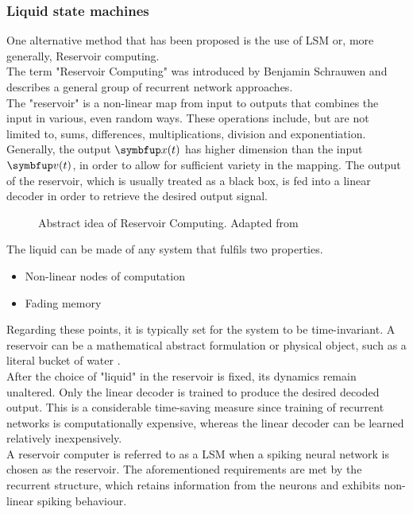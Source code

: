 \subsubsection{Liquid state machines}
One alternative method that has been proposed is the use of \ac{LSM} or, more generally, Reservoir computing.\\
The term "Reservoir Computing" was introduced by Benjamin Schrauwen and describes a general group of recurrent network approaches\cite{verstraeten_experimental_2007}.\\
The "reservoir" is a non-linear map from input to outputs that combines the input in various, even random ways. These operations include, but are not limited to, sums, differences, multiplications, division and exponentiation. Generally, the output $\bmu{x}(t)$ has higher dimension than the input $\bmu{v}(t)$, in order to allow for sufficient variety in the mapping. The output of the reservoir, which is usually treated as a black box, is fed into a linear decoder in order to retrieve the desired output signal.\\
\begin{figure}
	\centering
	
	\caption{Abstract idea of Reservoir Computing. Adapted from \cite{cooper_liquid_2011}}
	\label{fig:reservoir_computing}
\end{figure}
The liquid can be made of any system that fulfils two properties.\\
\begin{itemize}
	\item Non-linear nodes of computation
	\item Fading memory
\end{itemize}
Regarding these points, it is typically set for the system to be time-invariant\cite{cooper_liquid_2011}.
A reservoir can be a mathematical abstract formulation or physical object, such as a literal bucket of water \cite{tanaka_recent_2019}.\\
After the choice of "liquid" in the reservoir is fixed, its dynamics remain unaltered. Only the linear decoder is trained to produce the desired decoded output\cite{jaeger_echo_2010}. This is a considerable time-saving measure since training of recurrent networks is computationally expensive, whereas the linear decoder can be learned relatively inexpensively.\\
A reservoir computer is referred to as a \ac{LSM} when a spiking neural network is chosen as the reservoir. The aforementioned requirements are met by the recurrent structure, which retains information from the neurons and exhibits non-linear spiking behaviour.\\
